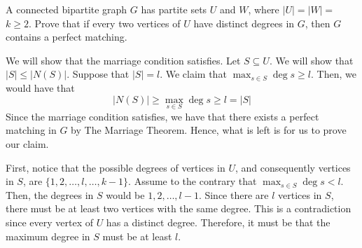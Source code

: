\question A connected bipartite graph \(G\) has partite sets 
\(U\) and \(W\), where \(|U| = |W| = \) \(k \geq 2\). Prove that
if every two vertices of \(U\) have distinct degrees in \(G\),
then \(G\) contains a perfect matching.

\begin{solution}
  We will show that the marriage condition satisfies. Let \(S
  \subseteq U\). We will show that \(|S| \leq |N(S)|\). Suppose
  that \(|S| = l\). We claim that \(\max_{s \in S} \deg s \geq 
  l\). Then, we would have that 
  \[
    |N(S)| \geq \max_{s \in S} \deg s \geq l = |S|
  \]
  Since the marriage condition satisfies, we have that there
  exists a perfect matching in \(G\) by The Marriage Theorem.
  Hence, what is left is for us to prove our claim.

  First, notice that the possible degrees of vertices in \(U\),
  and consequently vertices in \(S\), are \(\{1, 2, \ldots, l,
  \ldots, k-1\}\). Assume to the contrary that \(\max_{s \in S}
  \deg s < l\). Then, the degrees in \(S\) would be \(1, 2,
  \ldots, l-1\). Since there are \(l\) vertices in \(S\), there
  must be at least two vertices with the same degree. This is a
  contradiction since every vertex of \(U\) has a distinct
  degree. Therefore, it must be that the maximum degree in \(S\)
  must be at least \(l\).
\end{solution}
